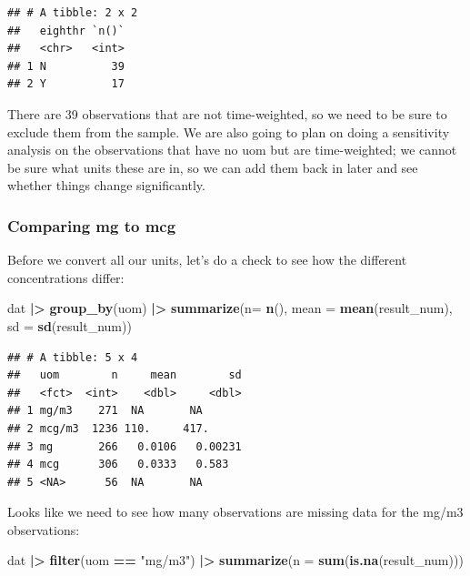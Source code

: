 \documentclass[
]{article}
\newenvironment{Shaded}{\begin{snugshade}}{\end{snugshade}}
\newcommand{\AttributeTok}[1]{\textcolor[rgb]{0.13,0.29,0.53}{#1}}
\newcommand{\FunctionTok}[1]{\textcolor[rgb]{0.13,0.29,0.53}{\textbf{#1}}}
\newcommand{\NormalTok}[1]{#1}
\newcommand{\SpecialCharTok}[1]{\textcolor[rgb]{0.81,0.36,0.00}{\textbf{#1}}}
\newcommand{\StringTok}[1]{\textcolor[rgb]{0.31,0.60,0.02}{#1}}
\begin{document}
\begin{verbatim}
## # A tibble: 2 x 2
##   eighthr `n()`
##   <chr>   <int>
## 1 N          39
## 2 Y          17
\end{verbatim}

There are 39 observations that are not time-weighted, so we need to be
sure to exclude them from the sample. We are also going to plan on doing
a sensitivity analysis on the observations that have no uom but are
time-weighted; we cannot be sure what units these are in, so we can add
them back in later and see whether things change significantly.

\subsubsection{Comparing mg to mcg}\label{comparing-mg-to-mcg}

Before we convert all our units, let's do a check to see how the
different concentrations differ:

\begin{Shaded}
\begin{Highlighting}[]
\NormalTok{dat }\SpecialCharTok{|\textgreater{}} 
  \FunctionTok{group\_by}\NormalTok{(uom) }\SpecialCharTok{|\textgreater{}} 
  \FunctionTok{summarize}\NormalTok{(}\AttributeTok{n=} \FunctionTok{n}\NormalTok{(),}
            \AttributeTok{mean =} \FunctionTok{mean}\NormalTok{(result\_num),}
            \AttributeTok{sd =} \FunctionTok{sd}\NormalTok{(result\_num))}
\end{Highlighting}
\end{Shaded}

\begin{verbatim}
## # A tibble: 5 x 4
##   uom        n     mean        sd
##   <fct>  <int>    <dbl>     <dbl>
## 1 mg/m3    271  NA       NA      
## 2 mcg/m3  1236 110.     417.     
## 3 mg       266   0.0106   0.00231
## 4 mcg      306   0.0333   0.583  
## 5 <NA>      56  NA       NA
\end{verbatim}

Looks like we need to see how many observations are missing data for the
mg/m3 observations:

\begin{Shaded}
\begin{Highlighting}[]
\NormalTok{dat }\SpecialCharTok{|\textgreater{}} 
  \FunctionTok{filter}\NormalTok{(uom }\SpecialCharTok{==} \StringTok{"mg/m3"}\NormalTok{) }\SpecialCharTok{|\textgreater{}} 
  \FunctionTok{summarize}\NormalTok{(}\AttributeTok{n =} \FunctionTok{sum}\NormalTok{(}\FunctionTok{is.na}\NormalTok{(result\_num)))}
\end{Highlighting}
\end{Shaded}
\end{document}
